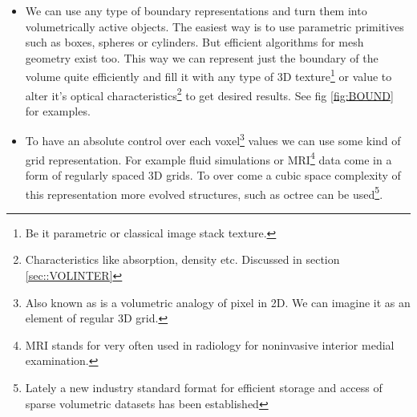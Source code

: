 {\begin{itemize}
\item {}
We can use any type of boundary representations and turn them into volumetrically active objects. The easiest way is to use parametric primitives such as boxes, spheres or cylinders. But efficient algorithms for mesh geometry exist too. This way we can represent just the boundary of the volume quite efficiently and fill it with any type of 3D texture\footnote{Be it parametric or classical image stack texture.} or value to alter it's optical characteristics\footnote{Characteristics like absorption, density etc. Discussed in section \ref{sec::VOLINTER}} to get desired results. See fig \ref{fig:BOUND} for examples.


\item {}
To have an absolute control over each voxel\footnote{Also known as  is a volumetric analogy of pixel in 2D. We can imagine it as an element of regular 3D grid.} values we can use some kind of grid representation. For example fluid simulations or MRI\footnote{MRI stands for  very often used in radiology for noninvasive interior medial examination. } data come in a form of regularly spaced 3D grids. To over come a cubic space complexity of this representation more evolved structures, such as octree can be used\footnote{Lately a new industry standard format \cite{OPENVDB} for efficient storage and access of sparse volumetric datasets has been established}.


\end{itemize}}
